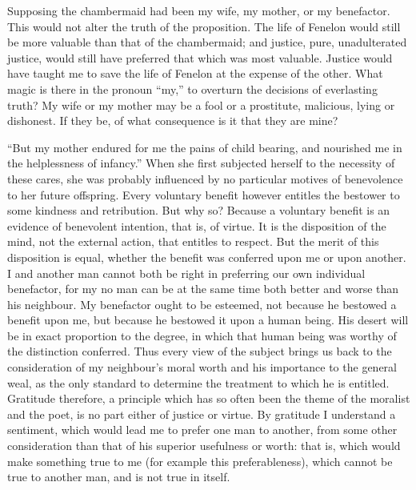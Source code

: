 Supposing the chambermaid had been my wife, my mother, or my
benefactor. This would not alter the truth of the proposition. The
life of Fenelon would still be more valuable than that of the
chambermaid; and justice, pure, unadulterated justice, would still
have preferred that which was most valuable. Justice would have taught
me to save the life of Fenelon at the expense of the other. What magic
is there in the pronoun ``my,'' to overturn the decisions of
everlasting truth? My wife or my mother may be a fool or a prostitute,
malicious, lying or dishonest. If they be, of what consequence is it
that they are mine?

``But my mother endured for me the pains of child bearing, and
nourished me in the helplessness of infancy.'' When she first
subjected herself to the necessity of these cares, she was probably
influenced by no particular motives of benevolence to her future
offspring. Every voluntary benefit however entitles the bestower to
some kindness and retribution. But why so? Because a voluntary benefit
is an evidence of benevolent intention, that is, of virtue. It is the
disposition of the mind, not the external action, that entitles to
respect. But the merit of this disposition is equal, whether the
benefit was conferred upon me or upon another. I and another man
cannot both be right in preferring  our own individual
benefactor, for my no man can be at the same time both better and
worse than his neighbour. My benefactor ought to be esteemed, not
because he bestowed a benefit upon me, but because he bestowed it upon
a human being. His desert will be in exact proportion to the degree,
in which that human being was worthy of the distinction conferred.
Thus every view of the subject brings us back to the consideration of
my neighbour's moral worth and his importance to the general weal, as
the only standard to determine the treatment to which he is
entitled. Gratitude therefore, a principle which has so often been the
theme of the moralist and the poet, is no part either of justice or
virtue. By gratitude I understand a sentiment, which would lead me to
prefer one man to another, from some other consideration than that of
his superior usefulness or worth: that is, which would make something
true to me (for example this preferableness), which cannot be true to
another man, and is not true in itself.

